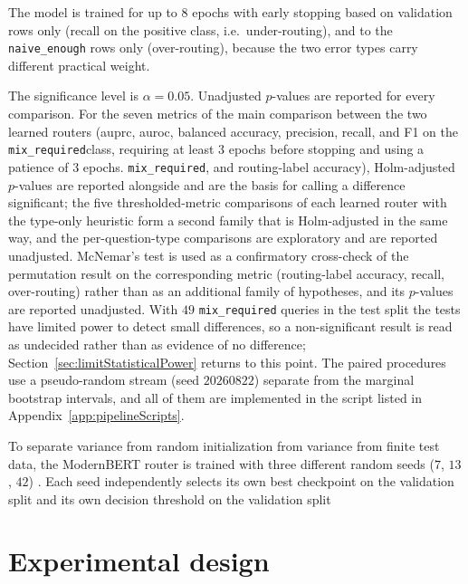 \documentclass[english, bibtex]{kththesis}               %
\numberwithin{listing}{chapter}
\providecommand{\DIFaddtex}[1]{{\protect\color{blue} \sf #1}} %
\providecommand{\DIFdeltex}[1]{{\protect\color{red} \scriptsize #1}} %
\providecommand{\DIFaddbegin}{} %
\providecommand{\DIFaddend}{} %
\providecommand{\DIFdelbegin}{} %
\providecommand{\DIFdelend}{} %
\providecommand{\DIFadd}[1]{\texorpdfstring{\DIFaddtex{#1}}{#1}} %
\providecommand{\DIFdel}[1]{\texorpdfstring{\DIFdeltex{#1}}{}} %
\begin{document}
\begin{description}
{The model is trained for up to $8$ epochs with early stopping based on validation }\DIFdelend \DIFaddbegin \DIFadd{rows only (recall on the positive class, i.e.\ under-routing), and to the \texttt{naive\_enough} rows only (over-routing), because the two error types carry different practical weight.
}\end{description}

\DIFadd{The significance level is $\alpha = 0.05$. Unadjusted $p$-values are reported for every comparison. For the seven metrics of the main comparison between the two learned routers (\gls{auprc}, \gls{auroc}, balanced accuracy, precision, recall, and }\DIFaddend F1 on \DIFdelbegin \DIFdel{the \texttt{mix\_required}class, requiring at least $3$ epochs before stopping and using a patience of $3$ epochs.
}\DIFdelend \DIFaddbegin \DIFadd{\texttt{mix\_required}, and routing-label accuracy), Holm-adjusted $p$-values \cite{holm1979} are reported alongside and are the basis for calling a difference significant; the five thresholded-metric comparisons of each learned router with the type-only heuristic form a second family that is Holm-adjusted in the same way, and the per-question-type comparisons are exploratory and are reported unadjusted. McNemar's test is used as a confirmatory cross-check of the permutation result on the corresponding metric (routing-label accuracy, recall, over-routing) rather than as an additional family of hypotheses, and its $p$-values are reported unadjusted. With $49$ \texttt{mix\_required} queries in the test split the tests have limited power to detect small differences, so a non-significant result is read as undecided rather than as evidence of no difference; Section~\ref{sec:limitStatisticalPower} returns to this point. The paired procedures use a pseudo-random stream (seed $20260822$) separate from the marginal bootstrap intervals, and all of them are implemented in the script listed in Appendix~\ref{app:pipelineScripts}.
}\DIFaddend 

\DIFdelbegin \DIFdel{To separate variance from random initialization from variance from finite test data, the ModernBERT router is trained with three different random seeds ($7$, $13$, $42$) . Each seed independently selects its own best checkpoint on the validation split and its own decision threshold on the validation split }\DIFdelend \DIFaddbegin \section{Experimental design}
\label{sec:methodExperiments}
\end{document}
